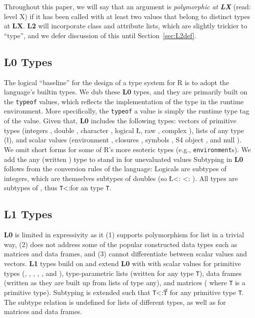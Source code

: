 \documentclass[acmsmall,10pt,review,anonymous]{acmart}\settopmatter{printfolios=true,printccs=false,printacmref=false}
\newcommand{\code}[1]{\lstinline|#1|\xspace}
\begin{document}
Throughout this paper, we will say that an argument is {\it polymorphic at} \textbf{\emph{LX}} (read: level X) if it has been called with at least two values that belong to distinct types at {\bf LX}.
\textbf{L2} will incorporate class and attribute lists, which are slightly trickier to ``type'', and we defer discussion of this until Section~\ref{sec:L2def}.

\subsection{L0 Types}
\label{sec:L0def}

The logical ``baseline'' for the design of a type system for R is to adopt the language's builtin types.
We dub these {\bf L0} types, and they are primarily built on the \code{typeof} values, which reflects the implementation of the type in the runtime environment.
More specifically, the \code{typeof} a value is simply the runtime type tag of the value.
Given that, {\bf L0} includes the following types: vectors of primitive types (integers
\I, double \D, character \C, logical \L, raw \R, complex \X), lists of any
type (\l), and scalar values (environment \sE, closures \sF, symbols \sY, S4
object \sS, and null \sN). We omit short forms for some of R's more esoteric types (e.g., {\tt environment}s).
 We add the any (written \ANY)  type to stand in for unevaluated values
Subtyping in {\bf L0} follows from the conversion rules of the language:  Logicals are subtypes of integers, which
are themselves subtypes of doubles (so \L <: \I <: \D).  All types are subtypes of \ANY,
thus {\tt T}<:\ANY for an type {\tt T}.

%
%
\subsection{L1 Types}
\label{sec:L1def}

{\bf L0} is limited in expressivity as it (1) supports polymorphism for list in
a trivial way, (2) does not address some of the popular constructed data
types such as matrices and data frames, and (3) cannot differentiate between
scalar values and vectors.  
{\bf L1} types build on and extend {\bf L0} with with scalar values for primitive types (\sI, \sD, \sC, \sL, \sR, and \sX), type-parametric lists (written  for any type {\tt T}), data frames (written  as they are built up from lists of type any), and matrices ( where {\tt T} is a primitive type).
Subtyping is extended such that {\tt T}<:{$\vec{\tt T}$} for any primitive
type {\tt T}. The subtype relation is undefined for lists of different types, as well as for matrices and data frames.
\end{document}
